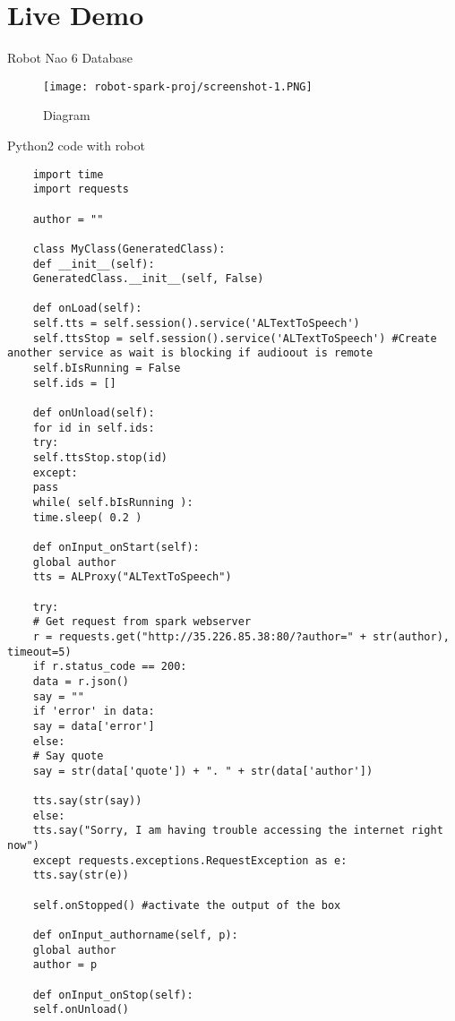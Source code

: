 \section{Live Demo}
    
    \frame{\sectionpage}
    
    \begin{frame}{Robot Nao 6 Database}
    	\begin{figure}
    		\centering
    		\texttt{[image: robot-spark-proj/screenshot-1.PNG]}
    		\caption{Diagram}
    	\end{figure}
    	
    \end{frame}
	{Python2 code with robot}
	\begin{verbatim}
	import time
	import requests
	
	author = ""
	
	class MyClass(GeneratedClass):
	def __init__(self):
	GeneratedClass.__init__(self, False)
	
	def onLoad(self):
	self.tts = self.session().service('ALTextToSpeech')
	self.ttsStop = self.session().service('ALTextToSpeech') #Create another service as wait is blocking if audioout is remote
	self.bIsRunning = False
	self.ids = []
	
	def onUnload(self):
	for id in self.ids:
	try:
	self.ttsStop.stop(id)
	except:
	pass
	while( self.bIsRunning ):
	time.sleep( 0.2 )
	
	def onInput_onStart(self):
	global author
	tts = ALProxy("ALTextToSpeech")
	
	try:
	# Get request from spark webserver
	r = requests.get("http://35.226.85.38:80/?author=" + str(author), timeout=5)
	if r.status_code == 200:
	data = r.json()
	say = ""
	if 'error' in data:
	say = data['error']
	else:
	# Say quote
	say = str(data['quote']) + ". " + str(data['author'])
	
	tts.say(str(say))
	else:
	tts.say("Sorry, I am having trouble accessing the internet right now")
	except requests.exceptions.RequestException as e:
	tts.say(str(e))
	
	self.onStopped() #activate the output of the box
	
	def onInput_authorname(self, p):
	global author
	author = p
	
	def onInput_onStop(self):
	self.onUnload()
	
	\end{verbatim}